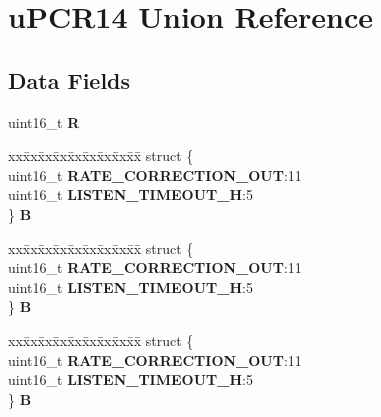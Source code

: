 \hypertarget{unionuPCR14}{}\section{u\+P\+C\+R14 Union Reference}
\label{unionuPCR14}
\subsection*{Data Fields}
\begin{DoxyCompactItemize}
\item 
\mbox{\label{unionuPCR14_a20fdda3ff8af1425778210bc4c786bb2}} 
uint16\+\_\+t {\bfseries R}
\item 
\mbox{\label{unionuPCR14_af89289d94cc7f24642f483d591338de1}} 
\begin{tabbing}
xx\=xx\=xx\=xx\=xx\=xx\=xx\=xx\=xx\=\kill
struct \{\\
\>uint16\_t {\bfseries RATE\_CORRECTION\_OUT}:11\\
\>uint16\_t {\bfseries LISTEN\_TIMEOUT\_H}:5\\
\} {\bfseries B}\\

\end{tabbing}\item 
\mbox{\label{unionuPCR14_a233d0abf57763e002c522e60dec89391}} 
\begin{tabbing}
xx\=xx\=xx\=xx\=xx\=xx\=xx\=xx\=xx\=\kill
struct \{\\
\>uint16\_t {\bfseries RATE\_CORRECTION\_OUT}:11\\
\>uint16\_t {\bfseries LISTEN\_TIMEOUT\_H}:5\\
\} {\bfseries B}\\

\end{tabbing}\item 
\mbox{\label{unionuPCR14_a8bdf1ef9fef637e19a5c0870100e02de}} 
\begin{tabbing}
xx\=xx\=xx\=xx\=xx\=xx\=xx\=xx\=xx\=\kill
struct \{\\
\>uint16\_t {\bfseries RATE\_CORRECTION\_OUT}:11\\
\>uint16\_t {\bfseries LISTEN\_TIMEOUT\_H}:5\\
\} {\bfseries B}\\


\end{tabbing}
\end{DoxyCompactItemize}
